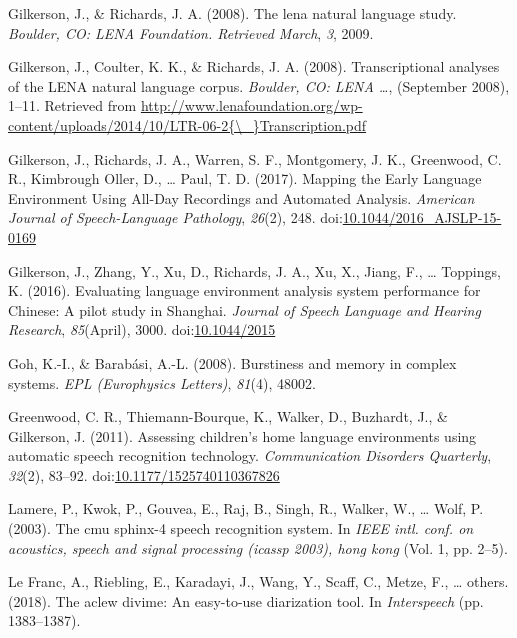 \documentclass[english,floatsintext,man]{apa6}
\begin{document}
\hypertarget{ref-gilkerson2008lena}{}
Gilkerson, J., \& Richards, J. A. (2008). The lena natural language
study. \emph{Boulder, CO: LENA Foundation. Retrieved March}, \emph{3},
2009.

\hypertarget{ref-Gilkerson2008ltr6}{}
Gilkerson, J., Coulter, K. K., \& Richards, J. A. (2008).
Transcriptional analyses of the LENA natural language corpus.
\emph{Boulder, CO: LENA \ldots{}}, (September 2008), 1--11. Retrieved
from
\href{http://www.lenafoundation.org/wp-content/uploads/2014/10/LTR-06-2\%7B/_\%7DTranscription.pdf}{http://www.lenafoundation.org/wp-content/uploads/2014/10/LTR-06-2\{\textbackslash{}\_\}Transcription.pdf}

\hypertarget{ref-Gilkerson2017}{}
Gilkerson, J., Richards, J. A., Warren, S. F., Montgomery, J. K.,
Greenwood, C. R., Kimbrough Oller, D., \ldots{} Paul, T. D. (2017).
Mapping the Early Language Environment Using All-Day Recordings and
Automated Analysis. \emph{American Journal of Speech-Language
Pathology}, \emph{26}(2), 248.
doi:\href{https://doi.org/10.1044/2016_AJSLP-15-0169}{10.1044/2016\_AJSLP-15-0169}

\hypertarget{ref-Gilkerson2016}{}
Gilkerson, J., Zhang, Y., Xu, D., Richards, J. A., Xu, X., Jiang, F.,
\ldots{} Toppings, K. (2016). Evaluating language environment analysis
system performance for Chinese: A pilot study in Shanghai. \emph{Journal
of Speech Language and Hearing Research}, \emph{85}(April), 3000.
doi:\href{https://doi.org/10.1044/2015}{10.1044/2015}

\hypertarget{ref-goh2008burstiness}{}
Goh, K.-I., \& Barabási, A.-L. (2008). Burstiness and memory in complex
systems. \emph{EPL (Europhysics Letters)}, \emph{81}(4), 48002.

\hypertarget{ref-Greenwood2011}{}
Greenwood, C. R., Thiemann-Bourque, K., Walker, D., Buzhardt, J., \&
Gilkerson, J. (2011). Assessing children's home language environments
using automatic speech recognition technology. \emph{Communication
Disorders Quarterly}, \emph{32}(2), 83--92.
doi:\href{https://doi.org/10.1177/1525740110367826}{10.1177/1525740110367826}

\hypertarget{ref-lamere2003cmu}{}
Lamere, P., Kwok, P., Gouvea, E., Raj, B., Singh, R., Walker, W.,
\ldots{} Wolf, P. (2003). The cmu sphinx-4 speech recognition system. In
\emph{IEEE intl. conf. on acoustics, speech and signal processing
(icassp 2003), hong kong} (Vol. 1, pp. 2--5).

\hypertarget{ref-le2018aclew}{}
Le Franc, A., Riebling, E., Karadayi, J., Wang, Y., Scaff, C., Metze,
F., \ldots{} others. (2018). The aclew divime: An easy-to-use
diarization tool. In \emph{Interspeech} (pp. 1383--1387).
\end{document}
